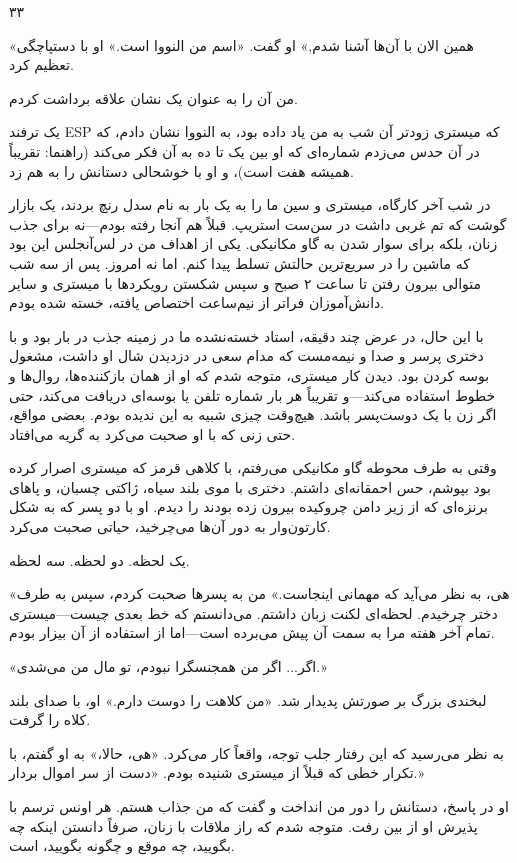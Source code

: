 ۳۳

«همین الان با آن‌ها آشنا شدم,» او گفت. «اسم من النووا است.» او با دستپاچگی تعظیم کرد.

من آن را به عنوان یک نشان علاقه برداشت کردم.

یک ترفند ESP که میستری زودتر آن شب به من یاد داده بود، به النووا نشان دادم، که در آن حدس می‌زدم شماره‌ای که او بین یک تا ده به آن فکر می‌کند (راهنما: تقریباً همیشه هفت است)، و او با خوشحالی دستانش را به هم زد.

در شب آخر کارگاه، میستری و سین ما را به یک بار به نام سدل رنچ بردند، یک بازار گوشت که تم غربی داشت در سن‌ست استریپ. قبلاً هم آنجا رفته بودم—نه برای جذب زنان، بلکه برای سوار شدن به گاو مکانیکی. یکی از اهداف من در لس‌آنجلس این بود که ماشین را در سریع‌ترین حالتش تسلط پیدا کنم. اما نه امروز. پس از سه شب متوالی بیرون رفتن تا ساعت ۲ صبح و سپس شکستن رویکردها با میستری و سایر دانش‌آموزان فراتر از نیم‌ساعت اختصاص یافته، خسته شده بودم.

با این حال، در عرض چند دقیقه، استاد خسته‌نشده ما در زمینه جذب در بار بود و با دختری پرسر و صدا و نیمه‌مست که مدام سعی در دزدیدن شال او داشت، مشغول بوسه کردن بود. دیدن کار میستری، متوجه شدم که او از همان بازکننده‌ها، روال‌ها و خطوط استفاده می‌کند—و تقریباً هر بار شماره تلفن یا بوسه‌ای دریافت می‌کند، حتی اگر زن با یک دوست‌پسر باشد. هیچ‌وقت چیزی شبیه به این ندیده بودم. بعضی مواقع، حتی زنی که با او صحبت می‌کرد به گریه می‌افتاد.

وقتی به طرف محوطه گاو مکانیکی می‌رفتم، با کلاهی قرمز که میستری اصرار کرده بود بپوشم، حس احمقانه‌ای داشتم. دختری با موی بلند سیاه، ژاکتی چسبان، و پاهای برنزه‌ای که از زیر دامن چروکیده بیرون زده بودند را دیدم. او با دو پسر که به شکل کارتون‌وار به دور آن‌ها می‌چرخید، حیاتی صحبت می‌کرد.

یک لحظه. دو لحظه. سه لحظه.

«هی، به نظر می‌آید که مهمانی اینجاست.» من به پسرها صحبت کردم، سپس به طرف دختر چرخیدم. لحظه‌ای لکنت زبان داشتم. می‌دانستم که خط بعدی چیست—میستری تمام آخر هفته مرا به سمت آن پیش می‌برده است—اما از استفاده از آن بیزار بودم.

«اگر... اگر من همجنسگرا نبودم، تو مال من می‌شدی.»

لبخندی بزرگ بر صورتش پدیدار شد. «من کلاهت را دوست دارم.» او، با صدای بلند کلاه را گرفت.

به نظر می‌رسید که این رفتار جلب توجه، واقعاً کار می‌کرد. «هی، حالا،» به او گفتم، با تکرار خطی که قبلاً از میستری شنیده بودم. «دست از سر اموال بردار.»

او در پاسخ، دستانش را دور من انداخت و گفت که من جذاب هستم. هر اونس ترسم با پذیرش او از بین رفت. متوجه شدم که راز ملاقات با زنان، صرفاً دانستن اینکه چه بگویید، چه موقع و چگونه بگویید، است.

